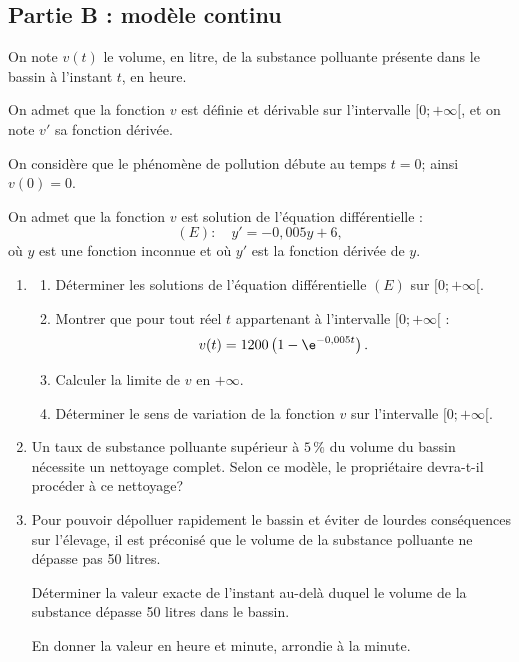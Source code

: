 	\subsection*{\centering Partie B : modèle continu}

		On note $v(t)$ le volume, en litre, de la substance polluante présente dans le bassin à l'instant $t$, en heure.

		On admet que la fonction $v$ est définie et dérivable sur l'intervalle $[0 ;+\infty[$, et on note $v'$ sa fonction dérivée.

		On considère que le phénomène de pollution débute au temps $t=0$; ainsi $v(0)=0$.

		On admet que la fonction $v$ est solution de l'équation différentielle :
		\[(E) : \quad y'=-0,005 y+6,\]
		où $y$ est une fonction inconnue et où $y'$ est la fonction dérivée de $y$.

		\begin{enumerate}
			\item \begin{enumerate}
				\item Déterminer les solutions de l'équation différentielle $(E)$ sur $[0 ;+\infty[$.

				\item Montrer que pour tout réel $t$ appartenant à l'intervalle $[0 ;+\infty[$ :
				\[v(t)=1200\left(1-\e^{-0,005 t}\right).\]

				\item Calculer la limite de $v$ en $+\infty$.

				\item Déterminer le sens de variation de la fonction $v$ sur l'intervalle $[0 ;+\infty[$.
			\end {enumerate}

			\item Un taux de substance polluante supérieur à $5\,\%$ du volume du bassin nécessite un nettoyage complet.
			Selon ce modèle, le propriétaire devra-t-il procéder à ce nettoyage?

			\item Pour pouvoir dépolluer rapidement le bassin et éviter de lourdes conséquences sur l'élevage, il est préconisé que le volume de la substance polluante ne dépasse pas 50 litres.

			Déterminer la valeur exacte de l'instant au-delà duquel le volume de la substance dépasse 50 litres dans le bassin.

			En donner la valeur en heure et minute, arrondie à la minute.
		\end{enumerate}

